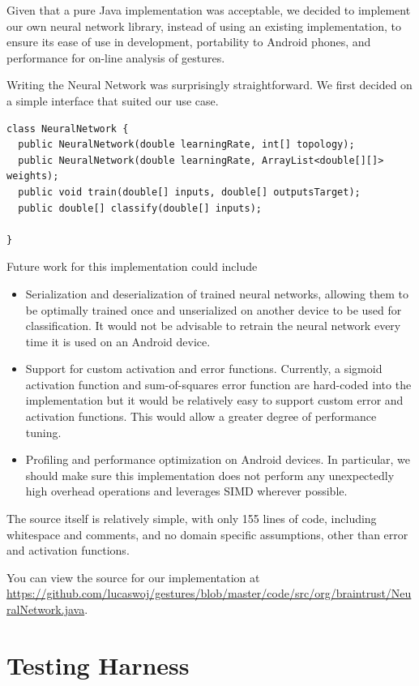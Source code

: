 \documentclass{report}
\begin{document}
Given that a pure Java implementation was acceptable, we decided to implement our own neural network library, instead of using an existing implementation, to ensure its ease of use in development, portability to Android phones, and performance for on-line analysis of gestures.

Writing the Neural Network was surprisingly straightforward. We first decided on a simple interface that suited our use case.
\begin{verbatim}
class NeuralNetwork {
  public NeuralNetwork(double learningRate, int[] topology);
  public NeuralNetwork(double learningRate, ArrayList<double[][]> weights);
  public void train(double[] inputs, double[] outputsTarget);
  public double[] classify(double[] inputs);

}
\end{verbatim}

Future work for this implementation could include
\begin{itemize}
\item Serialization and deserialization of trained neural networks, allowing them to be optimally trained once and unserialized on another device to be used for classification. It would not be advisable to retrain the neural network every time it is used on an Android device.
\item Support for custom activation and error functions. Currently, a sigmoid activation function and sum-of-squares error function are hard-coded into the implementation but it would be relatively easy to support custom error and activation functions. This would allow a greater degree of performance tuning.
\item Profiling and performance optimization on Android devices. In particular, we should make sure this implementation does not perform any unexpectedly high overhead operations and leverages SIMD wherever possible.
\end{itemize}

The source itself is relatively simple, with only 155 lines of code, including whitespace and comments, and no domain specific assumptions, other than error and activation functions.

You can view the source for our implementation at \url{https://github.com/lucaswoj/gestures/blob/master/code/src/org/braintrust/NeuralNetwork.java}.

\section{Testing Harness}
\end{document}
